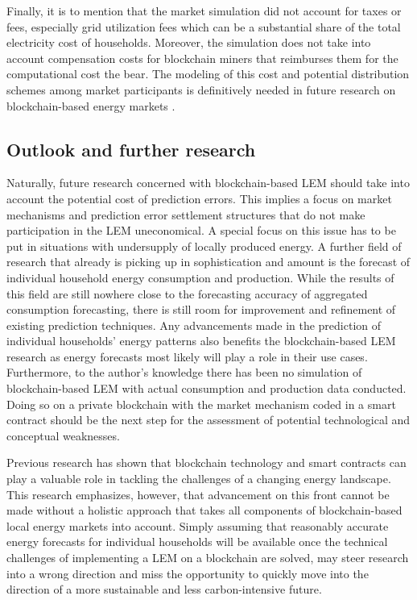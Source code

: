 Finally, it is to mention that the market simulation did not account for taxes or fees, especially grid utilization fees which can be a substantial share of the total electricity cost of households. Moreover, the simulation does not take into account compensation costs for blockchain miners that reimburses them for the computational cost the bear. The modeling of this cost and potential distribution schemes among market participants is definitively needed in future research on blockchain-based energy markets \citep{Mengelkamp:2018a}.




\subsection{Outlook and further research}\label{Sec:Conclusion;Subsec:Outlook}

Naturally, future research concerned with blockchain-based LEM should take into account the potential cost of prediction errors. This implies a focus on market mechanisms and prediction error settlement structures that do not make participation in the LEM uneconomical. A special focus on this issue has to be put in situations with undersupply of locally produced energy. A further field of research that already is picking up in sophistication and amount is the forecast of individual household energy consumption and production. While the results of this field are still nowhere close to the forecasting accuracy of aggregated consumption forecasting, there is still room for improvement and refinement of existing prediction techniques. Any advancements made in the prediction of individual households' energy patterns also benefits the blockchain-based LEM research as energy forecasts most likely will play a role in their use cases. Furthermore, to the author's knowledge there has been no simulation of blockchain-based LEM with actual consumption and production data conducted. Doing so on a private blockchain with the market mechanism coded in a smart contract should be the next step for the assessment of potential technological and conceptual weaknesses.

Previous research has shown that blockchain technology and smart contracts can play a valuable role in tackling the challenges of a changing energy landscape. This research emphasizes, however, that advancement on this front cannot be made without a holistic approach that takes all components of blockchain-based local energy markets into account. Simply assuming that reasonably accurate energy forecasts for individual households will be available once the technical challenges of implementing a LEM on a blockchain are solved, may steer research into a wrong direction and miss the opportunity to quickly move into the direction of a more sustainable and less carbon-intensive future.


